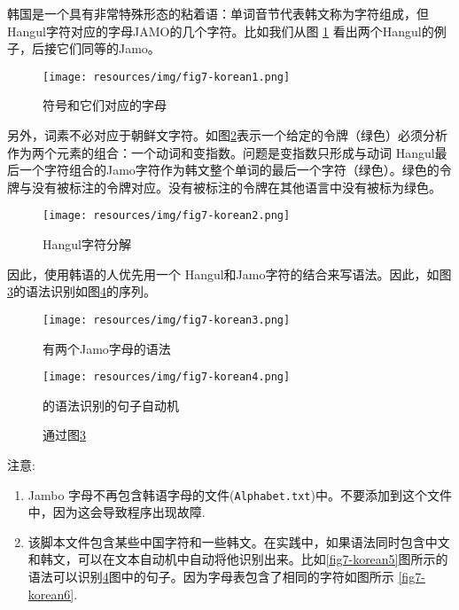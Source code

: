 韩国是一个具有非常特殊形态的粘着语：单词音节代表韩文称为字符组成，但Hangul字符对应的字母JAMO的几个字符。比如我们从图 \ref{fig7-korean1} 看出两个Hangul的例子，后接它们同等的Jamo。

\begin{figure}[!ht]
\begin{center}
\texttt{[image: resources/img/fig7-korean1.png]}
\caption{符号和它们对应的字母
\label{fig7-korean1}}
\end{center}
\end{figure}

\noindent
另外，词素不必对应于朝鲜文字符。如图\ref{fig7-korean2}表示一个给定的令牌（绿色）必须分析
作为两个元素的组合：一个动词和变指数。问题是变指数只形成与动词 Hangul最后一个字符组合的Jamo字符作为韩文整个单词的最后一个字符（绿色）。绿色的令牌与没有被标注的令牌对应。没有被标注的令牌在其他语言中没有被标为绿色。

\begin{figure}[!ht]
\begin{center}
\texttt{[image: resources/img/fig7-korean2.png]}
\caption{Hangul字符分解\label{fig7-korean2}}
\end{center}
\end{figure}

\bigskip
\noindent
因此，使用韩语的人优先用一个 Hangul和Jamo字符的结合来写语法。因此，如图\ref{fig7-korean3}的语法识别如图\ref{fig7-korean4}的序列。



\begin{figure}[!ht]
\begin{center}
\texttt{[image: resources/img/fig7-korean3.png]}
\caption{有两个Jamo字母的语法\label{fig7-korean3}}
\end{center}
\end{figure}

\begin{figure}[!ht]
\begin{center}
\texttt{[image: resources/img/fig7-korean4.png]}
\caption{通过图\ref{fig7-korean3}\label{fig7-korean4}}的语法识别的句子自动机
\end{center}
\end{figure}

\bigskip
\noindent 注意: 
\begin{enumerate}
\item 
Jambo 字母不再包含韩语字母的文件(\verb+Alphabet.txt+)中。不要添加到这个文件中，因为这会导致程序出现故障.
    
\item 

该脚本文件包含某些中国字符和一些韩文。在实践中，如果语法同时包含中文和韩文，可以在文本自动机中自动将他识别出来。比如\ref{fig7-korean5}图所示的语法可以识别\ref{fig7-korean4}图中的句子。因为字母表包含了相同的字符如图所示 \ref{fig7-korean6}.
\end{enumerate}




